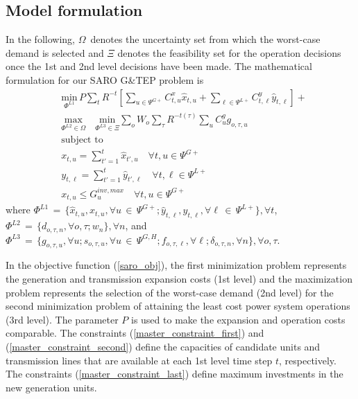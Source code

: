 \documentclass[final]{IEEEtran}
\newcommand{\myin}{\,{\in}\,}
\newcommand{\myeq}{\,{=}\,}
\begin{document}
\subsection{Model formulation}

In the following, $\Omega$ denotes the uncertainty set from which the worst-case demand is selected and $\Xi$ denotes the feasibility set for the operation decisions once the 1st and 2nd level decisions have been made. The mathematical formulation for our SARO G\&TEP problem is
\begin{align}
&\underset{\Phi^{L1}}{\text{min}} \, P \sum\limits_{t} R^{-t} \left[ \sum\limits_{u \in \Psi^{G+}} C^x_{t, u} \hat{x}_{t, u} + \sum\limits_{\ell \in \Psi^{L+}} C^y_{t, \ell} \hat{y}_{t, \ell} \right] + \nonumber \\
&\label{saro_obj}\underset{\Phi^{L2} \in \Omega}{\text{max}} \quad \underset{\Phi^{L3} \in \Xi}{\text{min}} \sum\limits_o W_o \sum\limits_{\tau} R^{-t(\tau)} \sum\limits_{u} C^g_{u} g_{o, \tau, u} \\
&\text{subject to} \nonumber \\
&\label{master_constraint_first} x_{t, u} = \sum\limits_{t' = 1}^{t} \hat{x}_{t', u} 	\quad \forall t, u \in \Psi^{G+} \\
&\label{master_constraint_second} y_{t, \ell} = \sum\limits_{t' = 1}^{t} \hat{y}_{t', \ell} 	\quad \forall t, \ell \in \Psi^{L+} \\
&\label{master_constraint_last} x_{t, u} \leq G^{inv, max}_u \quad \forall t, u \in \Psi^{G+}
\end{align}
where \( \Phi^{L1} \myeq \{ \hat{x}_{t, u}, x_{t, u}, \forall u \myin \Psi^{G+}; \hat{y}_{t, \ell}, y_{t, \ell}, \forall \ell \myin \Psi^{L+} \}, \forall t \), \( \Phi^{L2} \myeq \{ d_{o, \tau, n}, \forall o, \tau; w_{n} \}, \forall n \), and \( \Phi^{L3} \myeq \{ g_{o, \tau, u}, \forall u; s_{o, \tau, u}, \forall u \myin \Psi^{G, H}; f_{o, \tau, \ell}, \forall \ell; \delta_{o, \tau, n}, \forall n \}, \forall o, \tau \).

In the objective function (\ref{saro_obj}), the first minimization problem represents the generation and transmission expansion costs (1st level) and the maximization problem represents the selection of the worst-case demand (2nd level) for the second minimization problem of attaining the least cost power system operations (3rd level). The parameter $P$ is used to make the expansion and operation costs comparable. The constraints (\ref{master_constraint_first}) and (\ref{master_constraint_second}) define the capacities of candidate units and transmission lines that are available at each 1st level time step $t$, respectively. The constraints (\ref{master_constraint_last}) define maximum investments in the new generation units.
\end{document}
